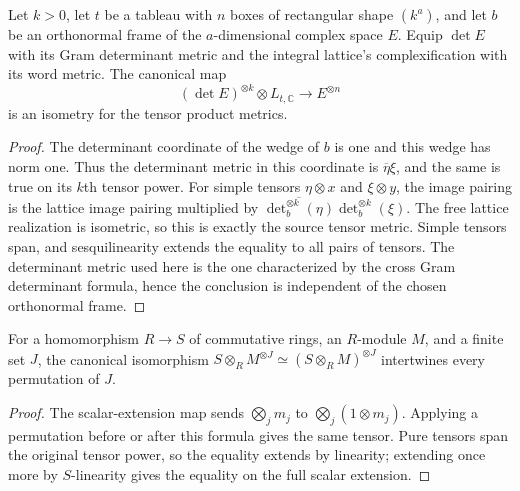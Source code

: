 \begin{lemma}
\label{lem:free-determinant-isometry}
\leanok
Let $k>0$, let $t$ be a tableau with $n$ boxes of rectangular shape
$(k^a)$, and let $b$ be an orthonormal frame of the $a$-dimensional
complex space $E$. Equip
$\det E$ with its Gram determinant metric and the integral lattice's
complexification with its word metric. The canonical map
\[
 (\det E)^{\otimes k}\otimes L_{t,\mathbb C}\longrightarrow E^{\otimes n}
\]
is an isometry for the tensor product metrics.
\end{lemma}
\begin{proof}
The determinant coordinate of the wedge of $b$ is one and this wedge
has norm one. Thus the determinant metric in this coordinate is
$\overline{\eta}\xi$, and the same is true on its $k$th tensor power.
For simple tensors $\eta\otimes x$ and $\xi\otimes y$, the image pairing
is the lattice image pairing multiplied by
$\overline{\det_b^{\otimes k}(\eta)}\det_b^{\otimes k}(\xi)$.
The free lattice realization is isometric, so this is exactly the
source tensor metric. Simple tensors span, and sesquilinearity extends
the equality to all pairs of tensors. The determinant metric used here
is the one characterized by the cross Gram determinant formula, hence
the conclusion is independent of the chosen orthonormal frame.
\end{proof}

\begin{lemma}
\label{lem:tensor-reindex-base-change}
\leanok
For a homomorphism $R\to S$ of commutative rings, an $R$-module $M$,
and a finite set $J$, the canonical isomorphism
$S\otimes_R M^{\otimes J}\simeq (S\otimes_R M)^{\otimes J}$
intertwines every permutation of $J$.
\end{lemma}
\begin{proof}
The scalar-extension map sends $\bigotimes_j m_j$ to
$\bigotimes_j(1\otimes m_j)$. Applying a permutation before or after
this formula gives the same tensor. Pure tensors span the original
tensor power, so the equality extends by linearity; extending once
more by $S$-linearity gives the equality on the full scalar extension.
\end{proof}

